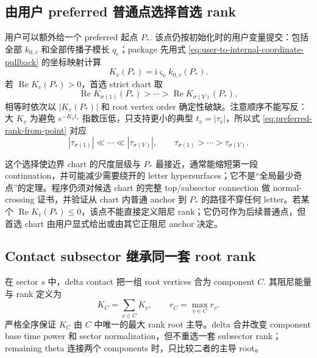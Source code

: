 \documentclass[11pt,a4paper]{ctexart}
\newcommand{\ii}{\mathrm i}
\begin{document}
\subsection{由用户 preferred 普通点选择首选 rank}

用户可以额外给一个 preferred 起点 $P_*$. 该点仍按初始化时的用户变量提交：包括全部 $k_{0,v}$ 和全部传播子模长 $q_e$；package 先用式 \eqref{eq:user-to-internal-coordinate-pullback} 的坐标映射计算
\begin{equation}
 K_v(P_*)=\ii\varsigma_vk_{0,v}(P_*).
\end{equation}
若 $\operatorname{Re}K_v(P_*)>0$，首选 strict chart 取
\begin{equation}
 \operatorname{Re}K_{\sigma(1)}(P_*)>\cdots>
 \operatorname{Re}K_{\sigma(V)}(P_*),
 \label{eq:preferred-rank-from-point}
\end{equation}
相等时依次以 $|K_v(P_*)|$ 和 root vertex order 确定性破缺。注意顺序不能写反：大 $K_v$ 为避免 $e^{-K_vt_v}$ 指数压低，只支持更小的典型 $t_v=|\tau_v|$，所以式 \eqref{eq:preferred-rank-from-point} 对应
\begin{equation}
 |\tau_{\sigma(1)}|\ll\cdots\ll|\tau_{\sigma(V)}|,
 \qquad
 \tau_{\sigma(1)}>\cdots>\tau_{\sigma(V)}.
\end{equation}

这个选择使边界 chart 的尺度层级与 $P_*$ 最接近，通常能缩短第一段 continuation，并可能减少需要绕开的 letter hypersurfaces；它不是“全局最少奇点”的定理。程序仍须对候选 chart 的完整 top/subsector connection 做 normal-crossing 证书，并验证从 chart 内普通 anchor 到 $P_*$ 的路径不穿任何 letter。若某个 $\operatorname{Re}K_v(P_*)\leq0$，该点不能直接定义阻尼 rank；它仍可作为后续普通点，但首选 chart 由用户显式给出或由其它正阻尼 anchor 决定。

\subsection{Contact subsector 继承同一套 root rank}

在 sector $s$ 中，delta contact 把一组 root vertices 合为 component $C$. 其阻尼能量与 rank 定义为
\begin{equation}
 K_C=\sum_{v\in C}K_v,
 \qquad
 r_C=\max_{v\in C}r_v.
 \label{eq:component-energy-rank}
\end{equation}
严格全序保证 $K_C$ 由 $C$ 中唯一的最大 rank root 主导。delta 合并改变 component base time power 和 sector normalization，但不重选一套 subsector rank；remaining theta 连接两个 components 时，只比较二者的主导 root。
\end{document}
